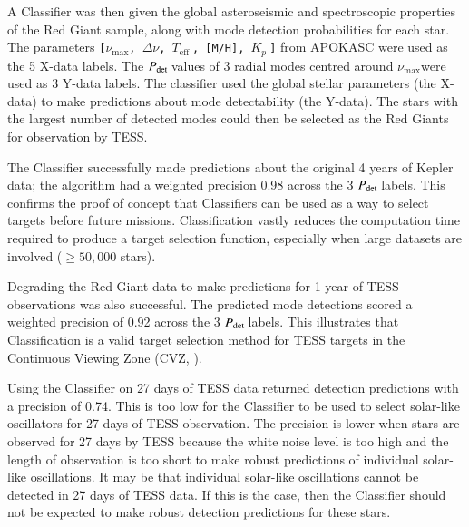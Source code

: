 \documentclass[a4paper,fleqn,usenatbib,useAMS]{mnras}
\newcommand{\numax}{\ensuremath{\nu_{\textrm{max}}}}
\newcommand{\dnu}{\ensuremath{\Delta\nu}}
\newcommand{\teff}{\ensuremath{T_{\textrm{eff}}\:}}
\newcommand{\kep}{\ensuremath{Kepler}\:}
\newcommand{\pdet}{\ensuremath{P_{\rm det}\:}}
\newcommand{\kp}{\ensuremath{K_{p}\:}}
\begin{document}
A Classifier was then given the global asteroseismic and spectroscopic properties of the Red Giant sample, along with mode detection probabilities for each star. The parameters \texttt{[\numax, \dnu, \teff, [M/H], \kp]} from APOKASC \citep{pinsonneault_apokasc_2014} were used as the 5 X-data labels. The \pdet values of 3 radial modes centred around \numax were used as 3 Y-data labels. %
The classifier used the global stellar parameters (the X-data) to make predictions about mode detectability (the Y-data). The stars with the largest number of detected modes could then be selected as the Red Giants for observation by TESS. 

The Classifier successfully made predictions about the original 4 years of Kepler data; the algorithm had a weighted precision 0.98 across the 3 \pdet labels. This confirms the proof of concept that Classifiers can be used as a way to select targets before future missions. Classification vastly reduces the computation time required to produce a target selection function, especially when large datasets are involved ($\geq50,000$ stars).

Degrading the Red Giant data to make predictions for 1 year of TESS observations was also successful. The predicted mode detections scored a weighted precision of 0.92 across the 3 \pdet labels. This illustrates that Classification is a valid target selection method for TESS targets in the Continuous Viewing Zone (CVZ, \citep{ricker_transiting_2014}).

Using the Classifier on 27 days of TESS data returned detection predictions with a precision of 0.74. This is too low for the Classifier to be used to select solar-like oscillators for 27 days of TESS observation. The precision is lower when stars are observed for 27 days by TESS because the white noise level is too high and the length of observation is too short to make robust predictions of individual solar-like oscillations. It may be that individual solar-like oscillations cannot be detected in 27 days of TESS data. If this is the case, then the Classifier should not be expected to make robust detection predictions for these stars.



\end{document}
